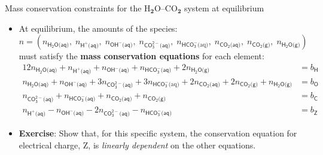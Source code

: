 %
%
\begin{frame}[<+->]{Mass conservation constraints for the H$_{\boldsymbol{2}}$O–CO$_{\boldsymbol{2}}$
system at equilibrium}
 
\begin{itemize}
\item At equilibrium, the amounts of the species:
\[
n=(n_{\mathsf{H_{2}O\text{(aq)}}},\;n_{\mathsf{H^{+}\text{(aq)}}},\;n_{\mathsf{OH^{-}\text{(aq)}}},\;n_{\mathsf{CO_{3}^{2-}\text{(aq)}}},\;n_{\mathsf{HCO_{3}^{-}}\text{(aq)}},\;n_{\mathsf{CO_{2}\text{(aq)}}},\;n_{\mathsf{CO_{2}\text{(g)}}},\;n_{\mathsf{H_{2}O\text{(g)}}})
\]
must satisfy the \textbf{mass conservation equations} for each element:{\small{}
\begin{alignat}{1}
2n_{\mathsf{H_{2}O\text{(aq)}}}+n_{\mathsf{H^{+}\text{(aq)}}}+n_{\mathsf{OH^{-}\text{(aq)}}}+n_{\mathsf{HCO_{3}^{-}\text{(aq)}}}+2n_{\mathsf{H_{2}O\text{(g)}}} & =b_{\mathsf{H}}\\
n_{\mathsf{H_{2}O\text{(aq)}}}+n_{\mathsf{OH^{-}\text{(aq)}}}+3n_{\mathsf{CO_{3}^{2-}\text{(aq)}}}+3n_{\mathsf{HCO_{3}^{-}}\text{(aq)}}+2n_{\mathsf{CO_{2}\text{(aq)}}}+2n_{\mathsf{CO_{2}\text{(g)}}}+n_{\mathsf{H_{2}O\text{(g)}}} & =b_{\mathsf{O}}\\
n_{\mathsf{CO_{3}^{2-}\text{(aq)}}}+n_{\mathsf{HCO_{3}^{-}\text{(aq)}}}+n_{\mathsf{CO_{2}\text{(aq)}}}+n_{\mathsf{CO_{2}\text{(g)}}} & =b_{\mathsf{C}}\\
n_{\mathsf{H^{+}\text{(aq)}}}-n_{\mathsf{OH^{-}\text{(aq)}}}-2n_{\mathsf{CO_{3}^{2-}\text{(aq)}}}-n_{\mathsf{HCO_{3}^{-}\text{(aq)}}} & =b_{\mathsf{Z}}
\end{alignat}
}{\small\par}
\item \alert{\textbf{Exercise}}: Show that, for this specific system, the conservation
equation for electrical charge, Z, is \emph{linearly dependent} on
the other equations.

\end{itemize}
\end{frame} 
%
